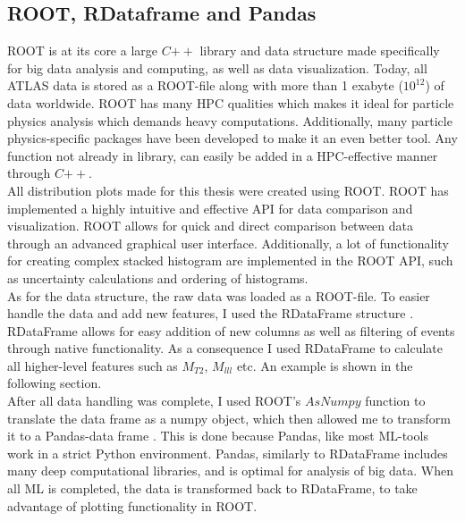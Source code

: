 \subsection{ROOT, RDataframe and Pandas}
ROOT \cite{ROOT} is at its core a large $C{++}$ library and data structure made specifically for big data
analysis and computing, as well as data visualization. Today, all ATLAS data is stored as a ROOT-file along
with more than 1 exabyte ($10^{12}$) of data worldwide. ROOT has many \ac{HPC} qualities which makes it ideal for particle
physics analysis which demands heavy computations. Additionally, many particle physics-specific packages
have been developed to make it an even better tool. Any function not already in library,
can easily be added in a \ac{HPC}-effective manner through $C{++}$.
\\
All distribution plots made for this thesis were created using ROOT. ROOT has implemented a highly intuitive and
effective \ac{API} for data comparison and visualization. ROOT allows for quick and direct 
comparison between data through an advanced graphical user interface. Additionally, a lot of
functionality for creating complex stacked histogram are implemented in the ROOT \ac{API}, such
as uncertainty calculations and ordering of histograms. 
\\
As for the data structure, the raw data was loaded as a ROOT-file. To easier handle the data and add
new features, I used the RDataFrame structure \cite{RDataFrame}. RDataFrame allows for easy 
addition of new columns as well as filtering of events through native functionality. As a consequence
I used RDataFrame to calculate all higher-level features such as $M_{T2}$, $M_{lll}$ etc. An example is 
shown in the following section. 
\\
After all data handling was complete, I used ROOT's $AsNumpy$ function to translate the data frame as 
a numpy object, which then allowed me to transform it to a Pandas-data frame \cite{Pandas}. This is done
because Pandas, like most \ac{ML}-tools work in a strict Python environment. Pandas, similarly to RDataFrame
includes many deep computational libraries, and is optimal for analysis of big data. When all \ac{ML} is completed,
the data is transformed back to RDataFrame, to take advantage of plotting functionality in ROOT.


